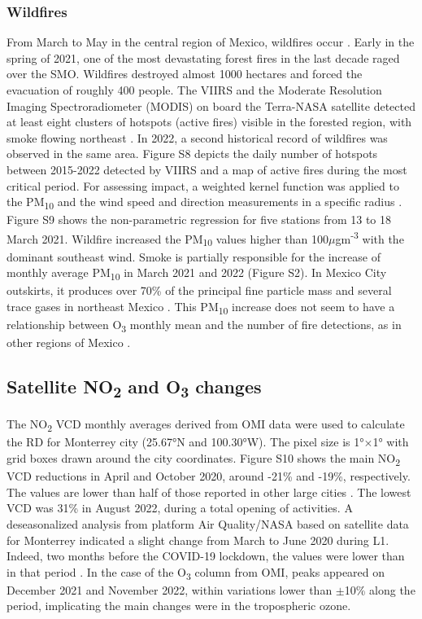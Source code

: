 \documentclass[sn-mathphys-num,iicol]{sn-jnl}
\begin{document}
\subsubsection{Wildfires}
\label{sec:wildfiles}
From March to May in the central region of Mexico, wildfires occur \citep{Bravo_2002}. Early in the spring of 2021, one of the most devastating forest fires in the last decade raged over the SMO. Wildfires destroyed almost 1000 hectares and forced the evacuation of roughly 400 people. The VIIRS and the Moderate Resolution Imaging Spectroradiometer (MODIS) on board the Terra-NASA satellite detected at least eight clusters of hotspots (active fires) visible in the forested region, with smoke flowing northeast \citep{web}. In 2022, a second historical record of wildfires was observed in the same area. Figure S8 depicts the daily number of hotspots between 2015-2022 detected by VIIRS and a map of active fires during the most critical period. For assessing impact, a weighted kernel function was applied to the PM\textsubscript{10} and the wind speed and direction measurements in a specific radius \citep{Henry2009,Petit_2017,Ji_2019}. Figure S9 shows the non-parametric regression for five stations from 13 to 18 March 2021. Wildfire increased the PM\textsubscript{10} values higher than 100$\mu$gm\textsuperscript{-3} with the dominant southeast wind. Smoke is partially responsible for the increase of monthly average PM\textsubscript{10} in March 2021 and 2022 (Figure S2). In Mexico City outskirts, it produces over 70\% of the principal fine particle mass \citep{Yokelson_2007} and several trace gases in northeast Mexico \citep{Mendoza_2005}. This PM\textsubscript{10} increase does not seem to have a relationship between O\textsubscript{3} monthly mean and the number of fire detections, as in other regions of Mexico \citep{Carbajal_2015}.
\subsection{Satellite NO\textsubscript{2} and O\textsubscript{3} changes}
The NO\textsubscript{2} VCD monthly averages derived from OMI data \citep{Lamsal_2020} were used to calculate the RD for Monterrey city (25.67°N and 100.30°W). The pixel size is 1°$\times$1° with grid boxes drawn around the city coordinates. Figure S10 shows the main NO\textsubscript{2} VCD reductions in April and October 2020, around -21\% and -19\%, respectively. The values are lower than half of those reported in other large cities \citep{Bauwens2020}. The lowest VCD was 31\% in August 2022, during a total opening of activities. A deseasonalized analysis from platform Air Quality/NASA based on satellite data for Monterrey indicated a slight change from March to June 2020 during L1. Indeed, two months before the COVID-19 lockdown, the values were lower than in that period \citep{quality}. In the case of the O\textsubscript{3} column from OMI, peaks appeared on December 2021 and November 2022, within variations lower than \(\pm\)10\% along the period, implicating the main changes were in the tropospheric ozone.
\end{document}
